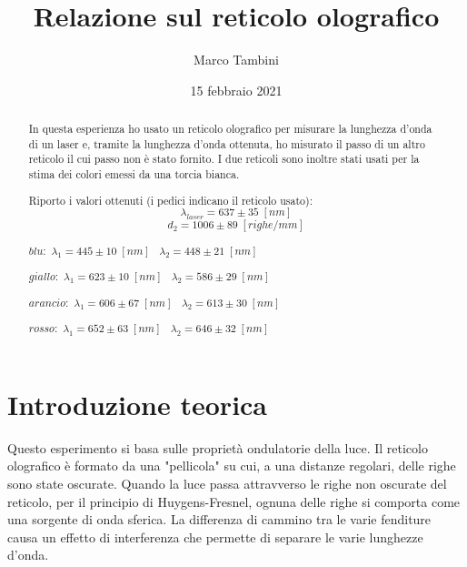 \documentclass{article}
\title{Relazione sul reticolo olografico}
\author{Marco Tambini}
\date{15 febbraio 2021}
\begin{document}
\maketitle

\begingroup
{}
\begin{abstract}
In questa esperienza ho usato un reticolo olografico per misurare la lunghezza d'onda di un laser e, tramite la lunghezza d'onda ottenuta, ho misurato il passo di un altro reticolo il cui passo non è stato fornito. I due reticoli sono inoltre stati usati per la stima dei colori emessi da una torcia bianca.

\vspace{3mm}

Riporto i valori ottenuti (i pedici indicano il reticolo usato):
\[ \lambda_{laser} = 637 \pm 35 \; [nm] \]
\[ d_2 = 1006 \pm 89 \; [righe / mm] \]

\begin{centering}
$blu:$ \;\;\;\;\;\; $\lambda_1 = 445 \pm 10\; [nm] \;\;\; \lambda_2 = 448 \pm 21\; [nm]$ 

$giallo:$ \;\; $\lambda_1 = 623 \pm 10\; [nm] \;\;\; \lambda_2 = 586 \pm 29\; [nm]$ 

$arancio:$ $\lambda_1 = 606 \pm 67\; [nm] \;\;\; \lambda_2 = 613 \pm 30\; [nm]$ 

$rosso:$ \;\;\; $\lambda_1 = 652 \pm 63\; [nm] \;\;\; \lambda_2 = 646 \pm 32\; [nm]$ 

\end{centering}
\end{abstract}
\endgroup

\tableofcontents

\clearpage

\section{Introduzione teorica}
Questo esperimento si basa sulle proprietà ondulatorie della luce. Il reticolo olografico è formato da una "pellicola" su cui, a una distanze regolari, delle righe sono state oscurate. Quando la luce passa attravverso le righe non oscurate del reticolo, per il principio di Huygens-Fresnel, ognuna delle righe si comporta come una sorgente di onda sferica. La differenza di cammino tra le varie fenditure causa un effetto di interferenza che permette di separare le varie lunghezze d'onda. 

\vspace{3mm}
\end{document}
